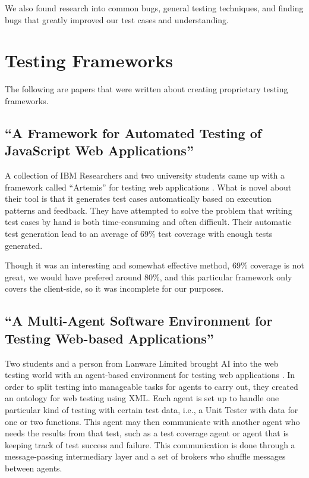 \documentclass[12pt]{ucthesis}
\begin{document}
We also found research into common bugs, general testing techniques, and finding bugs that greatly improved our test cases and understanding.

\section{Testing Frameworks}
The following are papers that were written about creating proprietary testing frameworks.

\subsection{``A Framework for Automated Testing of JavaScript Web Applications''}
A collection of IBM Researchers and two university students came up with a framework called ``Artemis'' for testing web applications \cite{FrameworkForAutomatedTesting}. What is novel about their tool is that it generates test cases automatically based on execution patterns and feedback. They have attempted to solve the problem that writing test cases by hand is both time-consuming and often difficult. Their automatic test generation lead to an average of 69\% test coverage with enough tests generated.

Though it was an interesting and somewhat effective method, 69\% coverage is not great, we would have prefered around 80\%, and this particular framework only covers the client-side, so it was incomplete for our purposes.

\subsection{``A Multi-Agent Software Environment for Testing Web-based Applications''}
Two students and a person from Lanware Limited brought AI into the web testing world with an agent-based environment for testing web applications \cite{MultiAgentSoftwareEnvironment}. In order to split testing into manageable tasks for agents to carry out, they created an ontology for web testing using XML. Each agent is set up to handle one particular kind of testing with certain test data, i.e., a Unit Tester with data for one or two functions. This agent may then communicate with another agent who needs the results from that test, such as a test coverage agent or agent that is keeping track of test success and failure. This communication is done through a message-passing intermediary layer and a set of brokers who shuffle messages between agents.
\end{document}
